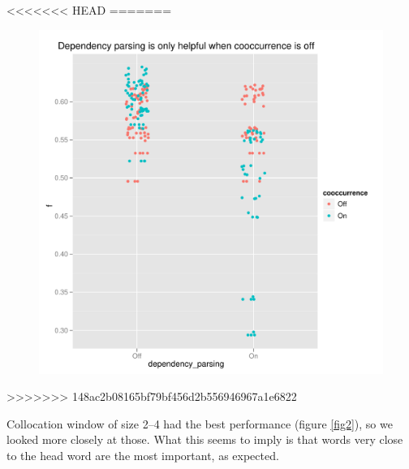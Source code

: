\documentclass{article}
\begin{document}
<<<<<<< HEAD
=======
\begin{figure}[H]
\includegraphics[width=\textwidth]{pg_0001}
\caption{\label{fig1}}
\end{figure}
>>>>>>> 148ac2b08165bf79bf456d2b556946967a1e6822

Collocation window of size 2--4 had the best performance (figure
\ref{fig2}), so we looked more closely at those. What this seems to
imply is that words very close to the head word are the most
important, as expected.
\end{document}
